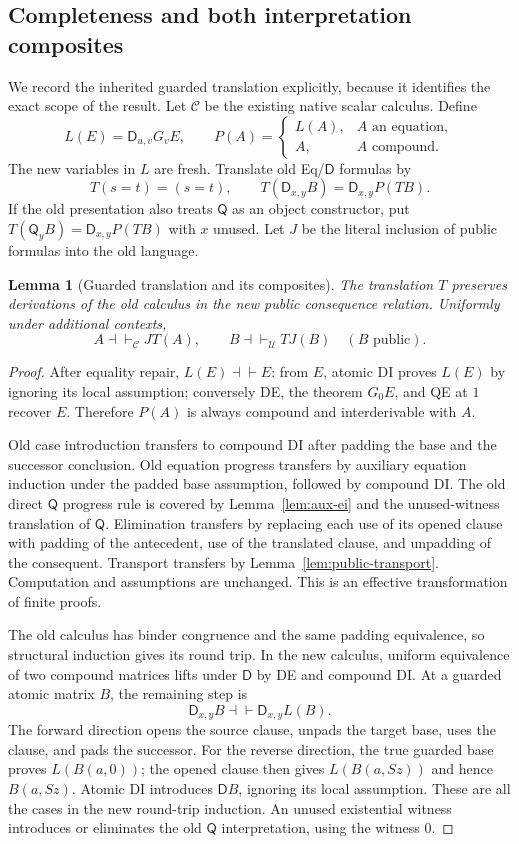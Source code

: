 \documentclass[11pt,letterpaper]{article}
\newtheorem{lemma}[theorem]{Lemma}
\theoremstyle{definition}
\newcommand{\D}{\mathsf D}
\newcommand{\Q}{\mathsf Q}
\newcommand{\A}{\mathcal A}
\newcommand{\U}{\mathcal U}
\begin{document}
\subsection{Completeness and both interpretation composites}

We record the inherited guarded translation explicitly, because it
identifies the exact scope of the result.  Let $\mathcal C$ be the
existing native scalar calculus.  Define
\[
 L(E)=\D_{u,v}G_vE,\qquad
 P(A)=\begin{cases}L(A),&A\text{ an equation},\\A,&A\text{ compound}.
 \end{cases}
\]
The new variables in $L$ are fresh.  Translate old Eq/$\D$ formulas by
\[
 T(s=t)=(s=t),\qquad
 T(\D_{x,y}B)=\D_{x,y}P(TB).
\]
If the old presentation also treats $\Q$ as an object constructor, put
$T(\Q_yB)=\D_{x,y}P(TB)$ with $x$ unused.  Let $J$ be the literal
inclusion of public formulas into the old language.

\begin{lemma}[Guarded translation and its composites]\label{lem:guarded-composites}
The translation $T$ preserves derivations of the old calculus in the new
public consequence relation.  Uniformly under additional contexts,
\[
 A\dashv\vdash_{\mathcal C}JT(A),\qquad
 B\dashv\vdash_{\U}TJ(B)\quad(B\text{ public}).
\]
\end{lemma}
\begin{proof}
After equality repair, $L(E)\dashv\vdash E$: from $E$, atomic DI
proves $L(E)$ by ignoring its local assumption; conversely DE, the
theorem $G_0E$, and QE at $1$ recover $E$.  Therefore $P(A)$ is
always compound and interderivable with $A$.

Old case introduction transfers to compound DI after padding the base
and the successor conclusion.  Old equation progress transfers by
auxiliary equation induction under the padded base assumption, followed
by compound DI.  The old direct $\Q$ progress rule is covered by
Lemma~\ref{lem:aux-ei} and the unused-witness translation of $\Q$.
Elimination transfers by replacing each use of its opened clause with
padding of the antecedent, use of the translated clause, and unpadding
of the consequent.  Transport transfers by
Lemma~\ref{lem:public-transport}.  Computation and assumptions are
unchanged.  This is an effective transformation of finite proofs.

The old calculus has binder congruence and the same padding equivalence,
so structural induction gives its round trip.  In the new calculus,
uniform equivalence of two compound matrices lifts under $\D$ by DE
and compound DI.  At a guarded atomic matrix $B$, the remaining step is
\[
 \D_{x,y}B\dashv\vdash\D_{x,y}L(B).
\]
The forward direction opens the source clause, unpads the target base,
uses the clause, and pads the successor.  For the reverse direction,
the true guarded base proves $L(B(a,0))$; the opened clause then gives
$L(B(a,Sz))$ and hence $B(a,Sz)$.  Atomic DI introduces $\D B$,
ignoring its local assumption.  These are all the cases in the new
round-trip induction.  An unused existential witness introduces or
eliminates the old $\Q$ interpretation, using the witness $0$.
\end{proof}
\end{document}
